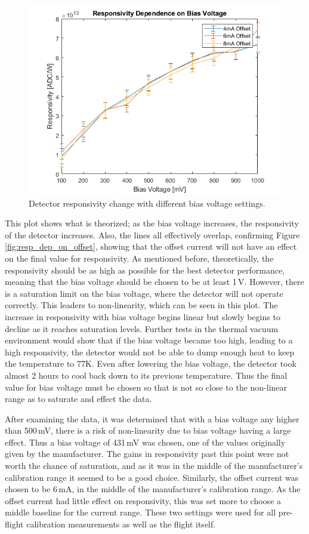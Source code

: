 \begin{figure}[h]
  \includegraphics[width=\linewidth]{chap6_images/verification/resp_dependence_on_bias.png}
  \caption{Detector responsivity change with different bias voltage settings.}
  \label{fig:resp_dep_on_bias}
\end{figure}

This plot shows what is theorized; as the bias voltage increases, the responsivity of the detector increases. Also, the lines all effectively overlap, confirming Figure \ref{fig:resp_dep_on_offset}, showing that the offset current will not have an effect on the final value for responsivity. As mentioned before, theoretically, the responsivity should be as high as possible for the best detector performance, meaning that the bias voltage should be chosen to be at least 1\,V. However, there is a saturation limit on the bias voltage, where the detector will not operate correctly. This leaders to non-linearity, which can be seen in this plot. The increase in responsivity with bias voltage begins linear but slowly begins to decline as it reaches saturation levels. Further tests in the thermal vacuum environment would show that if the bias voltage became too high, leading to a high responsivity, the detector would not be able to dump enough heat to keep the temperature to 77K. Even after lowering the bias voltage, the detector took almost 2 hours to cool back down to its previous temperature. Thus the final value for bias voltage must be chosen so that is not so close to the non-linear range as to saturate and effect the data.

After examining the data, it was determined that with a bias voltage any higher than 500\,mV, there is a risk of non-linearity due to bias voltage having a large effect. Thus a bias voltage of 431\,mV was chosen, one of the values originally given by the manufacturer. The gains in responsivity past this point were not worth the chance of saturation, and as it was in the middle of the manufacturer's calibration range it seemed to be a good choice. Similarly, the offset current was chosen to be 6\,mA, in the middle of the manufacturer's calibration range. As the offset current had little effect on responsivity, this was set more to choose a middle baseline for the current range. These two settings were used for all pre-flight calibration measurements as well as the flight itself.

